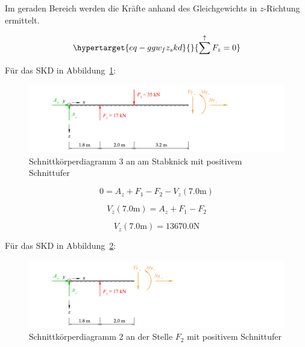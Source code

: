 \documentclass[
  12pt,
  letterpaper,
  DIV=11,
  egregdoesnotlikesansseriftitles]{scrartcl}
\begin{document}
Im geraden Bereich werden die Kräfte anhand des Gleichgewichts in
\(z\)-Richtung ermittelt.

\begin{equation}\protect\hypertarget{eq-ggw_fz_skd}{}{
\sum^\uparrow F_z = 0
}\label{eq-ggw_fz_skd}\end{equation}

Für das SKD in Abbildung~\ref{fig-skd_3}:

\begin{figure}[H]

{\centering \includegraphics{BSI_HS23_Testat_02_files/mediabag/../images/Testat_02_HS23_SKD_3.pdf}

}

\caption{\label{fig-skd_3}Schnittkörperdiagramm 3 an am Stabknick mit
positivem Schnittufer}

\end{figure}

\begin{equation}0 = A_{z} + F_{1} - F_{2} - V_{z}{\left(7.0 \text{m} \right)}\end{equation}

\begin{equation}V_{z}{\left(7.0 \text{m} \right)} = A_{z} + F_{1} - F_{2}\end{equation}

\begin{equation}V_{z}{\left(7.0 \text{m} \right)} = 13670.0 \text{N}\end{equation}

Für das SKD in Abbildung~\ref{fig-skd_2}:

\begin{figure}[H]

{\centering \includegraphics{BSI_HS23_Testat_02_files/mediabag/../images/Testat_02_HS23_SKD_2.pdf}

}

\caption{\label{fig-skd_2}Schnittkörperdiagramm 2 an der Stelle \(F_2\)
mit positivem Schnittufer}

\end{figure}
\end{document}
